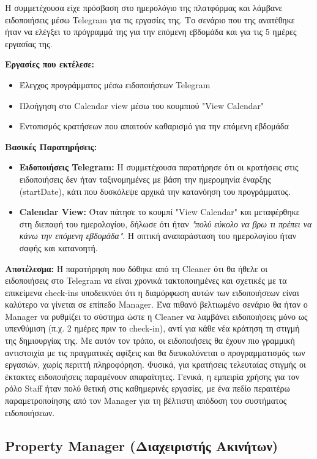 \documentclass[
	12pt, %
	oneside, %
	greek,
	onehalfspacing, %
	liststotoc, %
	toctotoc, %
	parskip, %
	headsepline, %
]{MastersDoctoralThesis} %
\begin{document}
Η συμμετέχουσα είχε πρόσβαση στο ημερολόγιο της πλατφόρμας και λάμβανε ειδοποιήσεις μέσω Telegram για τις εργασίες της. Το σενάριο που της ανατέθηκε ήταν να ελέγξει το πρόγραμμά της για την επόμενη εβδομάδα και για τις 5 ημέρες εργασίας της.

\textbf{Εργασίες που εκτέλεσε:}
\begin{itemize}
    \item Έλεγχος προγράμματος μέσω ειδοποιήσεων Telegram
    \item Πλοήγηση στο Calendar view μέσω του κουμπιού "View Calendar"
    \item Εντοπισμός κρατήσεων που απαιτούν καθαρισμό για την επόμενη εβδομάδα
\end{itemize}

\textbf{Βασικές Παρατηρήσεις:}
\begin{itemize}
    \item \textbf{Ειδοποιήσεις Telegram:} Η συμμετέχουσα παρατήρησε ότι οι κρατήσεις στις ειδοποιήσεις δεν ήταν ταξινομημένες με βάση την ημερομηνία έναρξης (startDate), κάτι που δυσκόλεψε αρχικά την κατανόηση του προγράμματος.
    \item \textbf{Calendar View:} Όταν πάτησε το κουμπί "View Calendar" και μεταφέρθηκε στη διεπαφή του ημερολογίου, δήλωσε ότι ήταν \textit{"πολύ εύκολο να βρω τι πρέπει να κάνω την επόμενη εβδομάδα"}. Η οπτική αναπαράσταση του ημερολογίου ήταν σαφής και κατανοητή.
\end{itemize}

\textbf{Αποτέλεσμα:} Η παρατήρηση που δόθηκε από τη Cleaner ότι θα ήθελε οι ειδοποιήσεις στο Telegram να είναι χρονικά τακτοποιημένες και σχετικές με τα επικείμενα check-ins υποδεικνύει ότι η διαμόρφωση αυτών των ειδοποιήσεων είναι καλύτερο να γίνεται σε επίπεδο Manager. Ένα πιθανό βελτιωμένο σενάριο θα ήταν ο Manager να ρυθμίζει το σύστημα ώστε η Cleaner να λαμβάνει ειδοποιήσεις μόνο ως υπενθύμιση (π.χ. 2 ημέρες πριν το check-in), αντί για κάθε νέα κράτηση τη στιγμή της δημιουργίας της. Με αυτόν τον τρόπο, οι ειδοποιήσεις θα έχουν πιο γραμμική αντιστοιχία με τις πραγματικές αφίξεις και θα διευκολύνεται ο προγραμματισμός των εργασιών, χωρίς περιττή πληροφόρηση. Φυσικά, για κρατήσεις τελευταίας στιγμής οι έκτακτες ειδοποιήσεις παραμένουν απαραίτητες. Γενικά, η εμπειρία χρήσης για τον ρόλο Staff ήταν πολύ θετική στις καθημερινές εργασίες, με ένα πεδίο περαιτέρω παραμετροποίησης από τον Manager για τη βέλτιστη απόδοση του συστήματος ειδοποιήσεων.

\subsection{Property Manager (Διαχειριστής Ακινήτων)}
\end{document}
